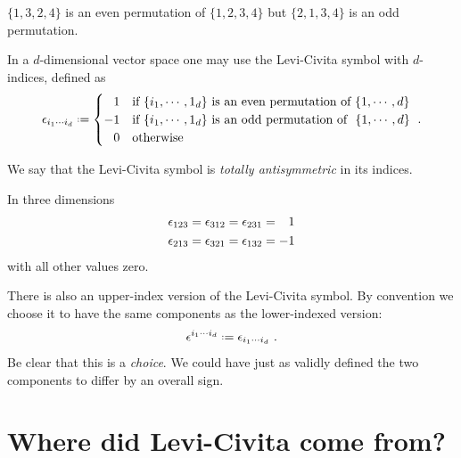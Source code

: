 \begin{example}
$\{1,3,2,4\}$ is an even permutation of $\{1,2,3,4\}$ but $\{2,1,3,4\}$ is an odd permutation.
\end{example}


\begin{wide}
In a $d$-dimensional vector space one may use the Levi-Civita symbol with $d$-indices, defined as
\begin{align}
    \epsilon_{i_1\cdots i_d} \defeq 
    \begin{cases}
    \pp 1 &\text{if }\{i_1,\cdots, 1_d\}\text{ is an even permutation of }\{1,\cdots, d\}\\
    -1 &\text{if }\{i_1,\cdots, 1_d\}\text{ is an odd permutation of }\ \{1,\cdots, d\}\\
    \pp 0 &\text{otherwise}
    \end{cases} \ .
    \label{eq:Levi:Civita:symbol:definition:d:dim}
\end{align}
\end{wide}
We say that the Levi-Civita symbol is \emph{totally antisymmetric} in its indices.

\begin{example}
In three dimensions
\begin{align}
\epsilon_{123} &=
\epsilon_{312} = 
\epsilon_{231} = \pp 1
\\
\epsilon_{213} &= 
\epsilon_{321} = 
\epsilon_{132} = -1 
\end{align}
with all other values zero.
\end{example}

There is also an upper-index version of the Levi-Civita symbol. By convention we choose it to have the same components as the lower-indexed version:
\begin{align}
    \epsilon^{i_1\cdots i_d}
    \defeq
    \epsilon_{i_1\cdots i_d} \ .
    \label{eq:def:levi:civita:d:dim:upper}
\end{align}
Be clear that this is a \emph{choice}. We could have just as validly defined the two components to differ by an overall sign.

\section{Where did Levi-Civita come from?} 

